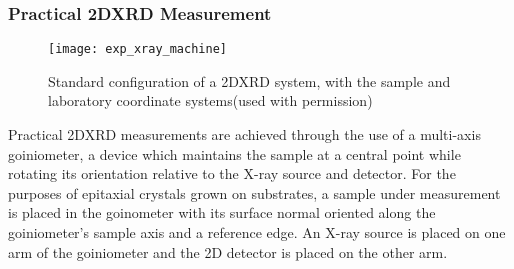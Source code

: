 \subsubsection{Practical 2DXRD Measurement}
\begin{figure}
 \centering \texttt{[image: exp\_xray\_machine]}
 \caption[Typical 2DXRD experimental implementation]{\label{fig:exp_xray_machine}Standard configuration of a 2DXRD system, with the sample and laboratory coordinate systems\cite{He2009}(used with permission)}
\end{figure}
Practical 2DXRD measurements are achieved through the use of a multi-axis goiniometer, a device which maintains the sample at a central point while rotating its orientation relative to the X-ray source and detector.
For the purposes of epitaxial crystals grown on substrates, a sample under measurement is placed in the goinometer with its surface normal oriented along the goiniometer's sample axis and a reference edge.
An X-ray source is placed on one arm of the goiniometer and the 2D detector is placed on the other arm.

